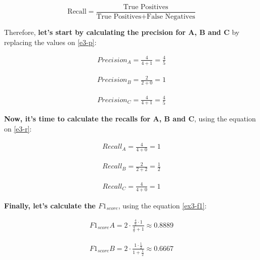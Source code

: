 \documentclass[12pt]{article}
\begin{document}
\begin{enumerate}[leftmargin=\labelsep]
        \begin{equation}\label{e3-r}
          \text{Recall} = \frac{\text{True Positives}}{{\text{True Positives} + \text{False Negatives}}}
        \end{equation}

        Therefore, \textbf{let's start by calculating the precision for A, B and C} by replacing the values on \eqref{e3-p}:

        \[
          \begin{aligned}
            Precision_A = \frac{4}{4+1} = \frac{4}{5}
          \end{aligned}
        \]

        \[
          \begin{aligned}
            Precision_B = \frac{2}{2+0} = 1
          \end{aligned}
        \]

        \[
          \begin{aligned}
            Precision_C = \frac{4}{4+1} = \frac{4}{5}
          \end{aligned}
        \]


        \textbf{Now, it's time to calculate the recalls for A, B and C}, using the equation on \eqref{e3-r}:

        \[
          \begin{aligned}
            Recall_A = \frac{4}{4+0} = 1
          \end{aligned}
        \]

        \[
          \begin{aligned}
            Recall_B = \frac{2}{2+2} = \frac{1}{2}
          \end{aligned}
        \]

        \[
          \begin{aligned}
            Recall_C = \frac{4}{4+0} = 1
          \end{aligned}
        \]

        \textbf{Finally, let's calculate the $F1_{score}$}, using the equation \eqref{ex3-f1}:

        \[
          \begin{aligned}
            F1_{score} A = 2 \cdot \frac{{ \frac{4}{5} \cdot 1 }}{{ \frac{4}{5} + 1 }} \approx 0.8889
          \end{aligned}
        \]

        \[
          \begin{aligned}
            F1_{score} B = 2 \cdot \frac{{ 1 \cdot \frac{1}{2} }}{{ 1 + \frac{1}{2} }} \approx 0.6667
          \end{aligned}
        \]


\end{enumerate}
\end{document}
